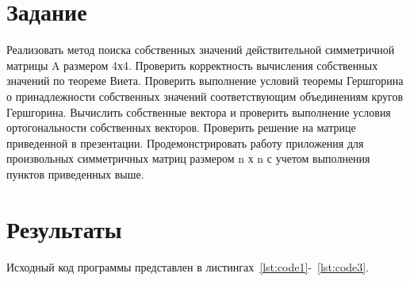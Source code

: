 \documentclass[a4paper, 14pt]{extarticle}
\begin{document}
\renewcommand{\ttdefault}{pcr}

\setlength{\tabcolsep}{3pt}
\newpage
\setcounter{page}{2}

\section{Задание}\label{Sect::task}

Реализовать метод поиска собственных значений действительной симметричной матрицы A размером 4х4. 
Проверить корректность вычисления собственных значений по теореме Виета.
Проверить выполнение условий теоремы Гершгорина о принадлежности собственных значений соответствующим объединениям кругов Гершгорина.
Вычислить собственные вектора и проверить выполнение условия ортогональности собственных векторов.
Проверить решение на матрице приведенной в презентации.
Продемонстрировать работу приложения для произвольных симметричных матриц размером n х n с учетом выполнения пунктов приведенных выше.

\section{Результаты}\label{Sect::res}

Исходный код программы представлен в листингах~\ref{lst:code1}-~\ref{lst:code3}.
\end{document}
